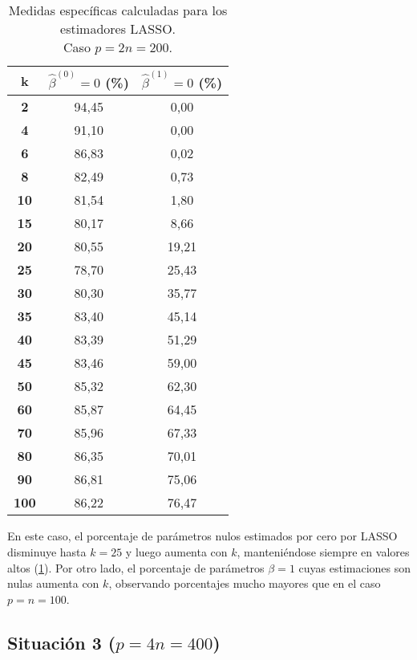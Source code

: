 \documentclass[a4paper,12pt]{report}
\begin{document}
\begin{table}[H]
\centering
\caption{Medidas específicas calculadas para los estimadores LASSO. \\ Caso $p=2n=200$.}
\label{tab: sit 2 lasso measures}
\footnotesize
\begin{tabular}{c|c|c}
\textbf{k} & $\hat{\beta}^{(0)} = 0$ (\%) & $\hat{\beta}^{(1)} = 0$ (\%) \\
\hline
\textbf{2} & 94,45 & \hspace{0.07cm} 0,00 \\
\textbf{4} & 91,10 & \hspace{0.07cm} 0,00 \\
\textbf{6} & 86,83 & \hspace{0.07cm} 0,02 \\
\textbf{8} & 82,49 & \hspace{0.07cm} 0,73 \\
\textbf{10} & 81,54 & \hspace{0.07cm} 1,80 \\
\textbf{15} & 80,17 & \hspace{0.07cm} 8,66 \\
\textbf{20} & 80,55 & 19,21 \\
\textbf{25} & 78,70 & 25,43 \\
\textbf{30} & 80,30 & 35,77 \\
\textbf{35} & 83,40 & 45,14 \\
\textbf{40} & 83,39 & 51,29 \\
\textbf{45} & 83,46 & 59,00 \\
\textbf{50} & 85,32 & 62,30 \\
\textbf{60} & 85,87 & 64,45 \\
\textbf{70} & 85,96 & 67,33 \\
\textbf{80} & 86,35 & 70,01 \\
\textbf{90} & 86,81 & 75,06 \\
\textbf{100} & 86,22 & 76,47
\end{tabular}
\end{table}

En este caso, el porcentaje de parámetros nulos estimados por cero por LASSO disminuye hasta $k=25$ y luego aumenta con $k$, manteniéndose siempre en valores altos (\ref{tab: sit 2 lasso measures}). Por otro lado, el porcentaje de parámetros $\beta=1$ cuyas estimaciones son nulas aumenta con $k$, observando porcentajes mucho mayores que en el caso $p=n=100$.

\subsection*{Situación 3 ($p=4n=400$)}
\end{document}
